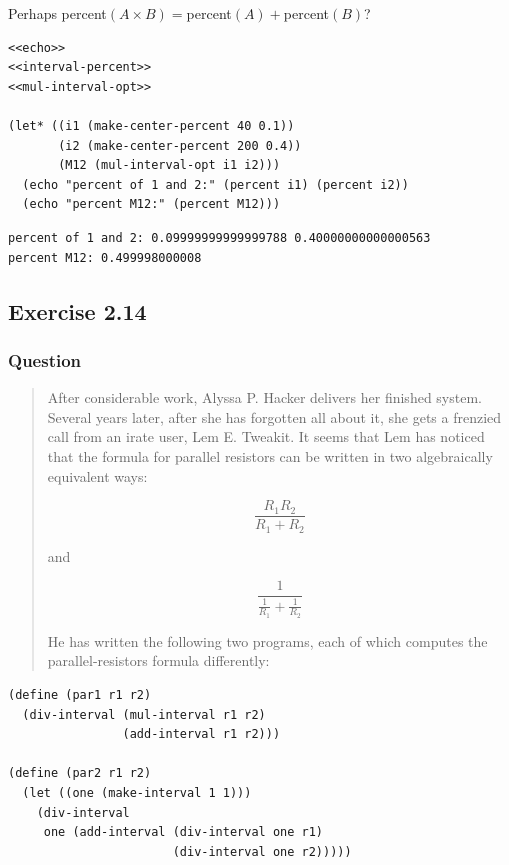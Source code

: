 \documentclass[final,fleqn,titlepage,twoside]{article}
\begin{document}
Perhaps percent\((A\times B) =\)percent\((A)+\)percent\((B)\)?

\begin{verbatim}
<<echo>>
<<interval-percent>>
<<mul-interval-opt>>

(let* ((i1 (make-center-percent 40 0.1))
       (i2 (make-center-percent 200 0.4))
       (M12 (mul-interval-opt i1 i2)))
  (echo "percent of 1 and 2:" (percent i1) (percent i2))
  (echo "percent M12:" (percent M12)))
\end{verbatim}

\begin{verbatim}
percent of 1 and 2: 0.09999999999999788 0.40000000000000563 
percent M12: 0.499998000008 
\end{verbatim}

\subsection{Exercise 2.14}
\label{sec:org5c46ebc}
\subsubsection{Question}
\label{sec:orgb0cb543}
\begin{quote}
After considerable work, Alyssa P. Hacker delivers her finished system. Several
years later, after she has forgotten all about it, she gets a frenzied call from
an irate user, Lem E. Tweakit. It seems that Lem has noticed that the formula
for parallel resistors can be written in two algebraically equivalent ways:

\[
\frac{R_1 R_2}{R_1 + R_2}
\]

and

\[
\frac{1}{\frac{1}{R_1} + \frac{1}{R_2}}
\]

He has written the following two programs, each of which computes the
parallel-resistors formula differently:
\end{quote}

\begin{verbatim}
(define (par1 r1 r2)
  (div-interval (mul-interval r1 r2)
                (add-interval r1 r2)))

(define (par2 r1 r2)
  (let ((one (make-interval 1 1)))
    (div-interval
     one (add-interval (div-interval one r1)
                       (div-interval one r2)))))
\end{verbatim}
\end{document}
